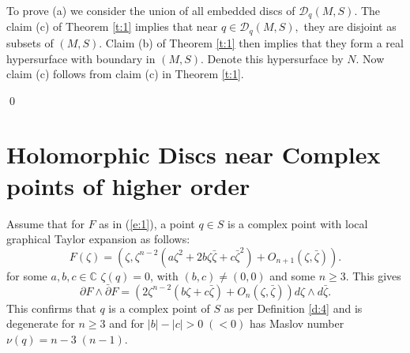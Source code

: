 \documentclass{amsart}
\newcommand{\be}{\begin{equation}}
\newcommand{\ee}{\end{equation}}
\begin{document}
\vspace{0.1in}
To prove (a) we consider the union of all embedded  discs of $\mathcal{D}_q(M,S)$. The claim (c) of Theorem \eqref{t:1} implies that near $q \in \mathcal{D}_q(M,S),$ they are disjoint as subsets of $(M,S).$ Claim (b) of  Theorem \ref{t:1} then implies that they form a real hypersurface with boundary in $(M,S).$ Denote this hypersurface by $N.$ Now claim (c) follows from claim (c) in Theorem \ref{t:1}.

\qed














\section{Holomorphic Discs near Complex points of higher order}\label{s:4}

Assume that for $F$ as in (\ref{e:1}), a point $ q \in  S$ is a complex point with local graphical Taylor expansion as follows:
\be \label{e:7}  
F(\zeta)=\left(\zeta, \zeta^{n-2}(a \zeta^2 + 2b \zeta \bar\zeta + c \bar \zeta^2) + O_{n+1}(\zeta, \bar\zeta)\right).
\ee
for some $ a, b, c \in \mathbb{C}$ $\zeta(q) =0$,   with $(b,c) \neq (0,0)$  and some  $n \ge 3$. This gives
\be
\partial F \wedge \bar\partial F = (2\zeta^{n-2}(b \zeta + c\bar{\zeta}) + O_n(\zeta, \bar \zeta))d\zeta \wedge d \bar\zeta.
\ee
This confirms that $q$ is a complex point of $S$ as per Definition \ref{d:4} and is degenerate for $n \ge 3$  and for $|b| - |c| > 0  \; ( < 0)$ has Maslov number $\nu(q) = n-3 \; (n-1)$. 
\end{document}
